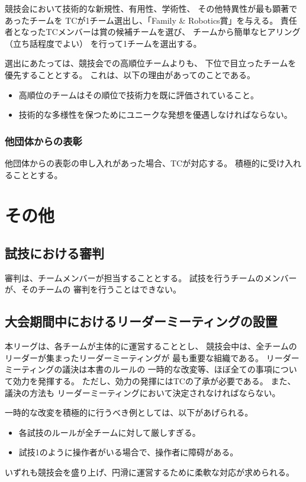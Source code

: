 \documentclass[a4j]{jarticle}
\begin{document}
競技会において技術的な新規性、有用性、学術性、
その他特異性が最も顕著であったチームを
TCが1チーム選出し、「Family \& Robotics賞」を与える。
責任者となったTCメンバーは賞の候補チームを選び、
チームから簡単なヒアリング（立ち話程度でよい）
を行って1チームを選出する。

選出にあたっては、競技会での高順位チームよりも、
下位で目立ったチームを優先することとする。
これは、以下の理由があってのことである。
\begin{itemize}
	\item 高順位のチームはその順位で技術力を既に評価されていること。
	\item 技術的な多様性を保つためにユニークな発想を優遇しなければならない。
\end{itemize}

\subsubsection{他団体からの表彰}

他団体からの表彰の申し入れがあった場合、TCが対応する。
積極的に受け入れることとする。

\section{その他}

\subsection{試技における審判}

審判は、チームメンバーが担当することとする。
試技を行うチームのメンバーが、そのチームの
審判を行うことはできない。

\subsection{大会期間中におけるリーダーミーティングの設置}

本リーグは、各チームが主体的に運営することとし、
競技会中は、全チームのリーダーが集まったリーダーミーティングが
最も重要な組織である。
リーダーミーティングの議決は本書のルールの
一時的な改変等、ほぼ全ての事項について効力を発揮する。
ただし、効力の発揮にはTCの了承が必要である。
また、議決の方法も
リーダーミーティングにおいて決定されなければならない。


一時的な改変を積極的に行うべき例としては、以下があげられる。
\begin{itemize}
	\item 各試技のルールが全チームに対して厳しすぎる。
	\item 試技1のように操作者がいる場合で、操作者に障碍がある。
\end{itemize}
いずれも競技会を盛り上げ、円滑に運営するために柔軟な対応が求められる。
\end{document}
